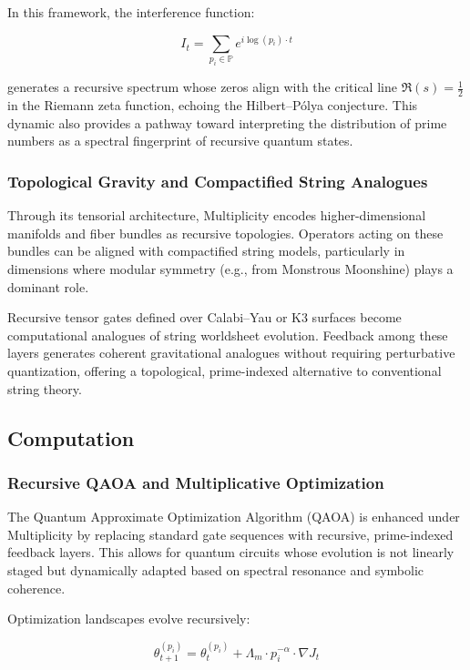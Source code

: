 \documentclass{article}
\theoremstyle{plain}
\begin{document}
In this framework, the interference function:

\[
I_t = \sum_{p_i \in \mathbb{P}} e^{i \log(p_i) \cdot t}
\]

generates a recursive spectrum whose zeros align with the critical line \( \Re(s) = \tfrac{1}{2} \) in the Riemann zeta function, echoing the Hilbert–Pólya conjecture. This dynamic also provides a pathway toward interpreting the distribution of prime numbers as a spectral fingerprint of recursive quantum states.

\subsubsection{Topological Gravity and Compactified String Analogues}

Through its tensorial architecture, Multiplicity encodes higher-dimensional manifolds and fiber bundles as recursive topologies. Operators acting on these bundles can be aligned with compactified string models, particularly in dimensions where modular symmetry (e.g., from Monstrous Moonshine) plays a dominant role.

Recursive tensor gates defined over Calabi–Yau or K3 surfaces become computational analogues of string worldsheet evolution. Feedback among these layers generates coherent gravitational analogues without requiring perturbative quantization, offering a topological, prime-indexed alternative to conventional string theory.

\subsection{Computation}

\subsubsection{Recursive QAOA and Multiplicative Optimization}

The Quantum Approximate Optimization Algorithm (QAOA) is enhanced under Multiplicity by replacing standard gate sequences with recursive, prime-indexed feedback layers. This allows for quantum circuits whose evolution is not linearly staged but dynamically adapted based on spectral resonance and symbolic coherence.

Optimization landscapes evolve recursively:

\[
\theta_{t+1}^{(p_i)} = \theta_t^{(p_i)} + \Lambda_m \cdot p_i^{-\alpha} \cdot \nabla J_t
\]
\end{document}
